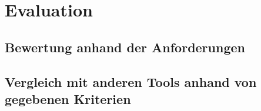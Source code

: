 \chapter{Evaluation}\label{ch:evaluation}

\section{Bewertung anhand der Anforderungen}

\section{Vergleich mit anderen Tools anhand von gegebenen Kriterien}